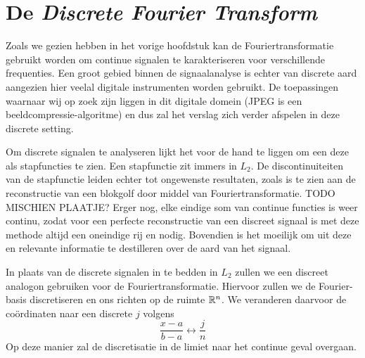 \section{De \emph{Discrete Fourier Transform}}
Zoals we gezien hebben in het vorige hoofdstuk kan de Fouriertransformatie gebruikt worden om continue signalen te karakteriseren voor verschillende frequenties. Een groot gebied binnen de signaalanalyse is echter van discrete aard aangezien hier veelal digitale instrumenten worden gebruikt. De toepassingen waarnaar wij op zoek zijn liggen in dit digitale domein (JPEG is een beeldcompressie-algoritme) en dus zal het verslag zich verder afspelen in deze discrete setting.

Om discrete signalen te analyseren lijkt het voor de hand te liggen om een deze als stapfuncties te zien. Een stapfunctie zit immers in $L_2$. De discontinuiteiten van de stapfunctie leiden echter tot ongewenste resultaten, zoals is te zien aan de reconstructie van een blokgolf door middel van Fouriertransformatie. TODO MISCHIEN PLAATJE?
Erger nog, elke eindige som van continue functies is weer continu, zodat voor een perfecte reconstructie van een discreet signaal is met deze methode altijd een oneindige rij \coefficient en nodig. Bovendien is het moeilijk om uit deze \coefficient en relevante informatie te destilleren over de aard van het signaal.

In plaats van de discrete signalen in te bedden in $L_2$ zullen we een discreet analogon gebruiken voor de Fouriertransformatie.
Hiervoor zullen we de Fourier-basis discretiseren en ons richten op de ruimte $\mathbb{R}^n$.
We veranderen daarvoor de co\"ordinaten naar een discrete $j$ volgens
\[
\frac{x-a}{b-a} \leftrightarrow \frac j n 
\]
Op deze manier zal de discretisatie in de limiet naar het continue geval overgaan. 

